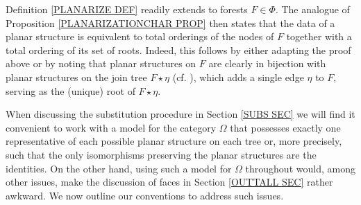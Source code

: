 \documentclass[a4paper,10pt]{article}%
\begin{document}
\begin{remark}\label{FORESTPLAN REM}
	Definition \ref{PLANARIZE DEF} readily extends to forests $F \in \Phi$. The analogue of Proposition \ref{PLANARIZATIONCHAR PROP} then states that the data of a planar structure is 
equivalent to total orderings of the nodes of $F$ together with a total ordering of its set of roots.
Indeed, this follows by either adapting the proof above or by noting that planar structures on $F$ are clearly in bijection with planar structures on the join tree $F \star \eta$ 
(cf. \cite[Def. 7.44]{Pe17}), which adds a single edge $\eta$ to $F$, serving as the (unique) root of $F \star \eta$.
\end{remark}


When discussing the substitution procedure in Section \ref{SUBS SEC} we will find it convenient to work with a model for the category $\Omega$ that possesses exactly one representative of each possible planar structure on each tree or, more precisely, such that the only isomorphisms preserving the planar structures are the identities. On the other hand, using such a model for $\Omega$ throughout would, among other issues, make the discussion of faces in Section \ref{OUTTALL SEC} rather awkward.
We now outline our conventions to address such issues.
\end{document}
